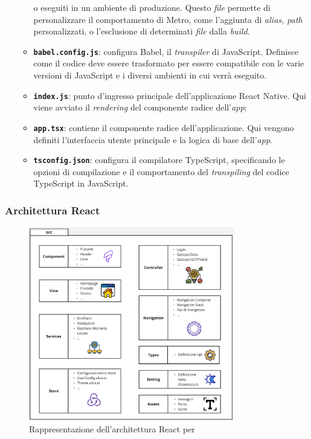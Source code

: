 \begin{itemize}
\begin{itemize}
                  o eseguiti in un ambiente di produzione. Questo \textit{file} permette di personalizzare il comportamento di Metro, come 
                  l'aggiunta di \textit{alias, path} personalizzati, o l'esclusione di determinati \textit{file} dalla \textit{build}.
            \item \textbf{\texttt{babel.config.js}}: configura Babel, il \textit{transpiler} di JavaScript. 
                  Definisce come il codice deve essere trasformato per essere compatibile con le varie versioni di JavaScript e i 
                  diversi ambienti in cui verrà eseguito.
            \item \textbf{\texttt{index.js}}: punto d'ingresso principale dell'applicazione React Native. Qui viene 
                  avviato il \textit{rendering} del componente radice dell'\textit{app};
            \item \textbf{\texttt{app.tsx}}: contiene il componente radice dell'applicazione. Qui vengono definiti l'interfaccia 
                  utente principale e la logica di base dell'\textit{app}.
            \item \textbf{\texttt{tsconfig.json}}: configura il compilatore TypeScript, specificando le opzioni di compilazione 
            e il comportamento del \textit{transpiling} del codice TypeScript in JavaScript.
          \end{itemize}
\end{itemize}
\subsubsection{Architettura React}

\begin{figure}[H]
      \centering
      \includegraphics[width=0.8\textwidth]{img/react_architecture.png}
      \caption{Rappresentazione dell'architettura React per {\movi}}
      \label{fig:frontend architecture}
\end{figure}

